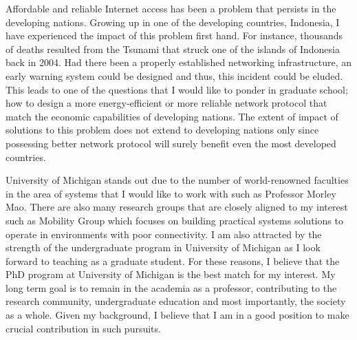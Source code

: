 \documentclass[11pt]{article}
\begin{document}
Affordable and reliable Internet access has been a problem that persists in the developing nations. Growing up in one of the developing countries, Indonesia, I have experienced the impact of this problem first hand. For instance, thousands of deaths resulted from the Tsunami that struck one of the islands of Indonesia back in 2004. Had there been a properly established networking infrastructure, an early warning system could be designed and thus, this incident could be eluded. This leads to one of the questions that I would like to ponder in graduate school; how to design a more energy-efficient or more reliable network protocol that match the economic capabilities of developing nations. The extent of impact of solutions to this problem does not extend to developing nations only since possessing better network protocol will surely benefit even the most developed countries. \newline

%

University of Michigan stands out due to the number of world-renowned faculties in the area of systems that I would like to work with such as Professor Morley Mao. There are also many research groups that are closely aligned to my interest such as Mobility Group which focuses on building practical systems solutions to operate in environments with poor connectivity. I am also attracted by the strength of the undergraduate program in University of Michigan as I look forward to teaching as a graduate student. For these reasons, I believe that the PhD program at University of Michigan is the best match for my interest. My long term goal is to remain in the academia as a professor, contributing to the research community, undergraduate education and most importantly, the society as a whole. Given my background, I believe that I am in a good position to make crucial contribution in such pursuits. \newline



\end{document}
